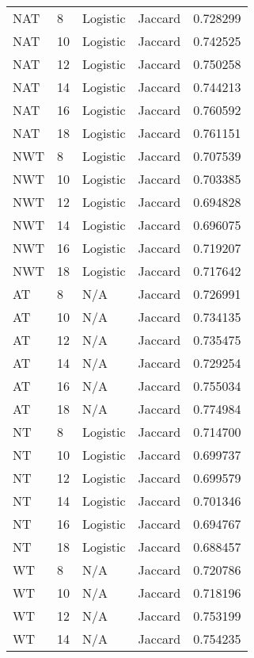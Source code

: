 \documentclass{article}
\begin{document}
\begin{center}
\begin{supertabular}{| l | l | l | l | l |}
            NAT & 8 & Logistic & Jaccard & 0.728299 \\
            NAT & 10 & Logistic & Jaccard & 0.742525 \\
            NAT & 12 & Logistic & Jaccard & 0.750258 \\
            NAT & 14 & Logistic & Jaccard & 0.744213 \\
            NAT & 16 & Logistic & Jaccard & 0.760592 \\
            NAT & 18 & Logistic & Jaccard & 0.761151 \\
            NWT & 8 & Logistic & Jaccard & 0.707539 \\
            NWT & 10 & Logistic & Jaccard & 0.703385 \\
            NWT & 12 & Logistic & Jaccard & 0.694828 \\
            NWT & 14 & Logistic & Jaccard & 0.696075 \\
            NWT & 16 & Logistic & Jaccard & 0.719207 \\
            NWT & 18 & Logistic & Jaccard & 0.717642 \\
            AT & 8 & N/A & Jaccard & 0.726991 \\
            AT & 10 & N/A & Jaccard & 0.734135 \\
            AT & 12 & N/A & Jaccard & 0.735475 \\
            AT & 14 & N/A & Jaccard & 0.729254 \\
            AT & 16 & N/A & Jaccard & 0.755034 \\
            AT & 18 & N/A & Jaccard & 0.774984 \\
            NT & 8 & Logistic & Jaccard & 0.714700 \\
            NT & 10 & Logistic & Jaccard & 0.699737 \\
            NT & 12 & Logistic & Jaccard & 0.699579 \\
            NT & 14 & Logistic & Jaccard & 0.701346 \\
            NT & 16 & Logistic & Jaccard & 0.694767 \\
            NT & 18 & Logistic & Jaccard & 0.688457 \\
            WT & 8 & N/A & Jaccard & 0.720786 \\
            WT & 10 & N/A & Jaccard & 0.718196 \\
            WT & 12 & N/A & Jaccard & 0.753199 \\
            WT & 14 & N/A & Jaccard & 0.754235 \\

\end{supertabular}
\end{center}
\end{document}
